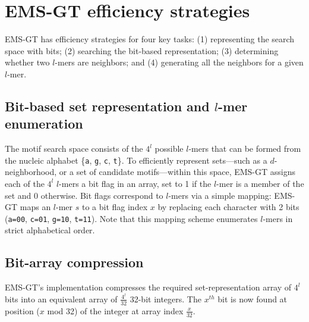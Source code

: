\documentclass[oneside,12pt]{DISCSthesis}
\begin{document}
	\section{EMS-GT efficiency strategies}
		EMS-GT has efficiency strategies for four key tasks: (1) representing the search space with bits; (2) searching the bit-based representation; (3) determining whether two $l$-mers are neighbors; and (4) generating all the neighbors for a given $l$-mer.

		\subsection{Bit-based set representation and $l$-mer enumeration}
			The motif search space consists of the $4^{l}$ possible $l$-mers that can be formed from the nucleic alphabet \{\texttt{a}, \texttt{g}, \texttt{c}, \texttt{t}\}. To efficiently represent sets---such as a $d$-neighborhood, or a set of candidate motifs---within this space, EMS-GT assigns each of the $4^{l}$ $l$-mers a bit flag in an array, set to 1 if the $l$-mer is a member of the set and 0 otherwise. Bit flags correspond to $l$-mers via a simple mapping: EMS-GT maps an $l$-mer $s$ to a bit flag index $x$ by replacing each character with 2 bits (\texttt{a=00}, \texttt{c=01}, \texttt{g=10}, \texttt{t=11}). Note that this mapping scheme enumerates $l$-mers in strict alphabetical order.\newline

		\subsection{Bit-array compression}
			EMS-GT's implementation compresses the required set-representation array of $4^{l}$ bits into an equivalent array of $\frac{4^{l}}{32}$ 32-bit integers. The $x^{th}$ bit is now found at position ($x$ mod 32) of the integer at array index $\frac{x}{32}$.\newline
\end{document}
